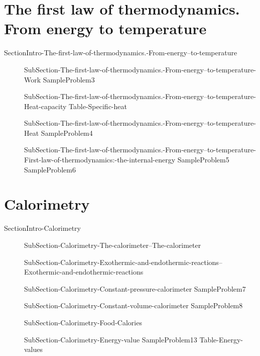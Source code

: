 \documentclass[main.tex]{subfiles}
\begin{document}
\section{The first law of thermodynamics. From energy  to temperature}
{SectionIntro-The-first-law-of-thermodynamics.-From-energy--to-temperature}
\sloppy\begin{description}
\item[] 
  {SubSection-The-first-law-of-thermodynamics.-From-energy--to-temperature-Work}
   {SampleProblem3}
\item[] 
  {SubSection-The-first-law-of-thermodynamics.-From-energy--to-temperature-Heat-capacity}
   {Table-Specific-heat}
\item[] 
  {SubSection-The-first-law-of-thermodynamics.-From-energy--to-temperature-Heat}
   {SampleProblem4}
\item[] 
  {SubSection-The-first-law-of-thermodynamics.-From-energy--to-temperature-First-law-of-thermodynamics:-the-internal-energy}
   {SampleProblem5}
   {SampleProblem6}
\end{description}

\section{Calorimetry}
{SectionIntro-Calorimetry}
\sloppy\begin{description}
\item[] 
  {SubSection-Calorimetry-The-calorimeter--The-calorimeter}
\item[] 
    {SubSection-Calorimetry-Exothermic-and-endothermic-reactions--Exothermic-and-endothermic-reactions}
\item[] 
  {SubSection-Calorimetry-Constant-pressure-calorimeter}
   {SampleProblem7}
\item[]  {SubSection-Calorimetry-Constant-volume-calorimeter}
   {SampleProblem8}
\hspace{-2cm}{Figure-Calorimeter}
\item[]  {SubSection-Calorimetry-Food-Calories}
\item[]  {SubSection-Calorimetry-Energy-value}
   {SampleProblem13}
   {Table-Energy-values}

\end{description}
     
\end{document}
